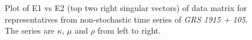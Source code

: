 \documentclass[10pt,conference]{IEEEtran}
\begin{document}
\begin{figure}
 \centering
 \caption{Plot of E1 vs E2 (top two right singular vectors) of data matrix for  representatives from non-stochastic time series of \textit{GRS 1915 + 105}. The series are $\kappa$, $\mu$ and $\rho$ from left to right.}
 \label{svd_e1e2_nonstochastic}
\end{figure}

\end{document}
